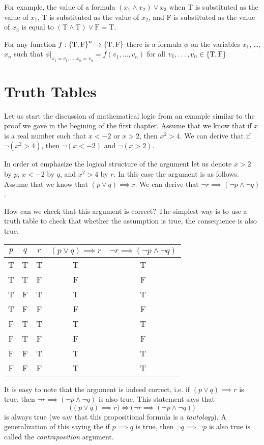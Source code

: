 For example, the value of a formula $(x_1 \land x_2) \lor x_3$ when T is
substituted as the value of $x_1$, T is substituted as the value of $x_2$,
and F is substituted as the value of $x_3$ is equal to
$(\text{T} \land \text{T}) \lor \text{F} = \text{T}$.

\begin{theorem}
  For any function $f : \set{\text{T}, \text{F}}^n \to
  \set{\text{T}, \text{F}}$ there is a
  formula $\phi$ on the variables $x_1$, \dots, $x_n$ such that
  $\phi\big\rvert_{x_1 = v_1, \dots, x_n = v_n} = f(v_1, \dots, v_n)$ for all
  $v_1, \dots, v_n \in \set{\text{T}, \text{F}}$
\end{theorem}

\section{Truth Tables}
Let us start the discussion of mathematical logic from an example similar to
the proof we gave in the begining of the first chapter. Assume that we know
that if $x$ is a real number such that $x < -2$ or $x > 2$, then $x^2 > 4$. We
can derive that if $\lnot (x^2 > 4)$, then $\lnot (x < -2)$ and $\lnot (x > 2)$.

In order ot emphasize the logical structure of the argument let us denote
$x > 2$ by $p$, $x < -2$ by $q$, and $x^2 > 4$ by $r$. In this case the
argument is as follows. Assume that we know that $(p \lor q) \implies r$. We
can derive that $\lnot r \implies (\lnot p \land \lnot q)$.

How can we check that this argument is correct? The simplest way is to use a
truth table to check that whether the assumption is true, the consequence is
also true.
\begin{center}
  \begin{tabular}{c | c | c | c | c}
    $p$ & $q$ & $r$ & $(p \lor q) \implies r$ &
      $\lnot r \implies (\lnot p \land \lnot q)$ \\
    \hline
    T & T & T & T & T \\
    T & T & F & F & F \\
    T & F & T & T & T \\
    T & F & F & F & F \\
    F & T & T & T & T \\
    F & T & F & F & F \\
    F & F & T & T & T \\
    F & F & F & T & T
  \end{tabular}
\end{center}
It is easy to note that the argument is indeed correct, i.e.
if $(p \lor q) \implies r$ is true, then
$\lnot r \implies (\lnot p \land \lnot q)$ is also true.
This statement says that
\[
  \bigl((p \lor q) \implies r\bigr) \iff
  \bigl(\lnot r \implies (\lnot p \land \lnot q) \bigr)
\]
is always true (we say that this propositional formula is a
\textit{tautology}). A generalization of this saying the if $p \implies q$ is
true, then $\lnot q \implies \lnot p$ is also true is called the
\textit{contraposition} argument.

